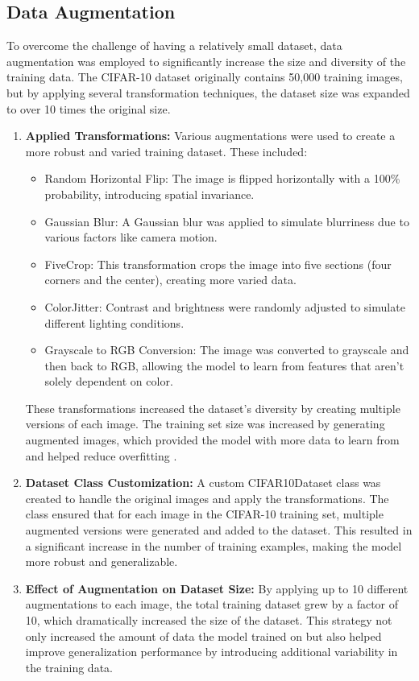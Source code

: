 \documentclass[twoside, 11pt]{article}
\begin{document}
\subsection{Data Augmentation}
To overcome the challenge of having a relatively small dataset, data augmentation was employed to significantly increase the size and diversity of the training data. The CIFAR-10 dataset originally contains 50,000 training images, but by applying several transformation techniques, the dataset size was expanded to over 10 times the original size.
\begin{enumerate}
    \item \textbf{Applied Transformations:} Various augmentations were used to create a more robust and varied training dataset. These included:
        \begin{itemize}
            \item Random Horizontal Flip: The image is flipped horizontally with a 100\% probability, introducing spatial invariance.
            \item Gaussian Blur: A Gaussian blur was applied to simulate blurriness due to various factors like camera motion.
            \item FiveCrop: This transformation crops the image into five sections (four corners and the center), creating more varied data.
            \item ColorJitter: Contrast and brightness were randomly adjusted to simulate different lighting conditions.
            \item Grayscale to RGB Conversion: The image was converted to grayscale and then back to RGB, allowing the model to learn from features that aren't solely dependent on color.
        \end{itemize}
        These transformations increased the dataset's diversity by creating multiple versions of each image. The training set size was increased by generating augmented images, which provided the model with more data to learn from and helped reduce overfitting \cite{perez2017effectiveness}.
    \item \textbf{Dataset Class Customization: }A custom CIFAR10Dataset class was created to handle the original images and apply the transformations. The class ensured that for each image in the CIFAR-10 training set, multiple augmented versions were generated and added to the dataset. This resulted in a significant increase in the number of training examples, making the model more robust and generalizable.
    \item \textbf{Effect of Augmentation on Dataset Size: } By applying up to 10 different augmentations to each image, the total training dataset grew by a factor of 10, which dramatically increased the size of the dataset. This strategy not only increased the amount of data the model trained on but also helped improve generalization performance by introducing additional variability in the training data.
\end{enumerate}
\end{document}
